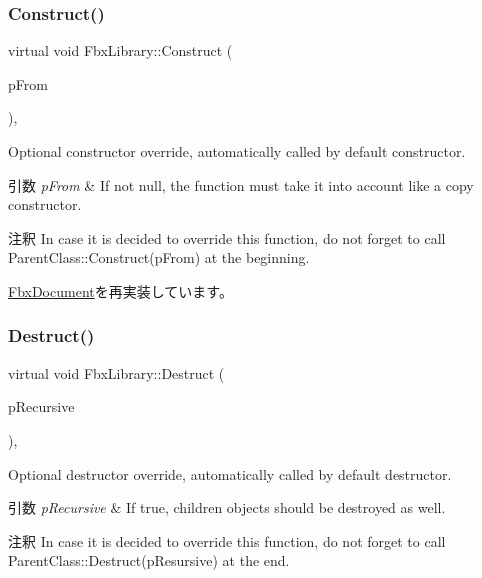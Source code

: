 \subsubsection{\texorpdfstring{Construct()}{Construct()}}
{\footnotesize\ttfamily virtual void Fbx\+Library\+::\+Construct (\begin{DoxyParamCaption}\item[{const \hyperlink{class_fbx_object}{Fbx\+Object} $\ast$}]{p\+From }\end{DoxyParamCaption})\hspace{0.3cm}{\ttfamily [protected]}, {\ttfamily [virtual]}}

Optional constructor override, automatically called by default constructor. 
\begin{DoxyParams}{引数}
{\em p\+From} & If not null, the function must take it into account like a copy constructor. \\
\hline
\end{DoxyParams}
\begin{DoxyRemark}{注釈}
In case it is decided to override this function, do not forget to call Parent\+Class\+::\+Construct(p\+From) at the beginning. 
\end{DoxyRemark}


\hyperlink{class_fbx_document_a9bc37787619a99fca90b839c16e4f2b8}{Fbx\+Document}を再実装しています。

\mbox{\label{class_fbx_library_ad763dd7c511f4c97d1163545de1bbbe9}} 
\subsubsection{\texorpdfstring{Destruct()}{Destruct()}}
{\footnotesize\ttfamily virtual void Fbx\+Library\+::\+Destruct (\begin{DoxyParamCaption}\item[{bool}]{p\+Recursive }\end{DoxyParamCaption})\hspace{0.3cm}{\ttfamily [protected]}, {\ttfamily [virtual]}}

Optional destructor override, automatically called by default destructor. 
\begin{DoxyParams}{引数}
{\em p\+Recursive} & If true, children objects should be destroyed as well. \\
\hline
\end{DoxyParams}
\begin{DoxyRemark}{注釈}
In case it is decided to override this function, do not forget to call Parent\+Class\+::\+Destruct(p\+Resursive) at the end. 
\end{DoxyRemark}


